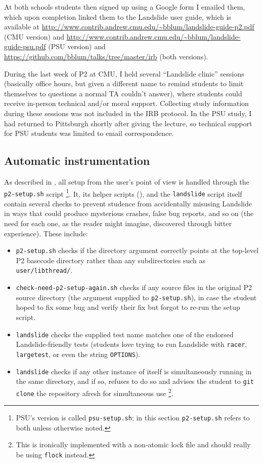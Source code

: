 At both schools students then signed up using a Google form I emailed them,
which upon completion linked them to the Landslide user guide,
which is available at
\url{http://www.contrib.andrew.cmu.edu/~bblum/landslide-guide-p2.pdf}
(CMU version)
and
\url{http://www.contrib.andrew.cmu.edu/~bblum/landslide-guide-psu.pdf}
(PSU version)
and
\url{https://github.com/bblum/talks/tree/master/irb}
(both versions).

During the last week of P2 at CMU, I held several ``Landslide clinic'' sessions
(basically office hours, but given a different name to remind students
to limit themselves to questions a normal TA couldn't answer),
where students could receive in-person technical and/or moral support.
Collecting study information during these sessions was not included in the IRB protocol.
In the PSU study, I had returned to Pittsburgh shortly after giving the lecture,
so technical support for PSU students was limited to email correspondence.

\subsection{Automatic instrumentation}
\label{sec:education-pebbles-instrumentation}

As described in \sect{\ref{sec:landslide-setup}},
all setup from the user's point of view is handled through the {\tt p2-setup.sh} script%
\footnote{PSU's version is called {\tt psu-setup.sh};
in this section {\tt p2-setup.sh} refers to both unless otherwise noted.
}.
It, its helper scripts (\sect{\ref{sec:landslide-glue}}),
and the {\tt landslide} script itself contain several checks to prevent
studence
from accidentally misusing Landslide in ways that could produce mysterious crashes, false bug reports, and so on
(the need for each one, as the reader might imagine, discovered through bitter experience).
These include:
\begin{itemize}
	\item {\tt p2-setup.sh} checks if the directory argument correctly points at the top-level P2 basecode directory
		rather than any subdirectories such as {\tt user/libthread/}.
	\item {\tt check-need-p2-setup-again.sh} checks if any source files in the original P2 source directory
		(the argument supplied to {\tt p2-setup.sh}),
		in case the student hoped to fix some bug and verify their fix but forgot to re-run the setup script.
	\item {\tt landslide} checks the supplied test name matches one of the endorsed Landslide-friendly tests
		(students love trying to run Landslide with {\tt racer}, {\tt largetest},
		or even the string {\tt OPTIONS}).
	\item {\tt landslide} checks if any other instance of itself is simultaneously running in the same directory,
		and if so, refuses to do so and advises the student
		to {\tt git clone} the repository afresh for simultaneous use%
		\footnote{This is ironically implemented with a non-atomic lock file
		and should really be using {\tt flock} instead.
		}.
\end{itemize}
\vspace{1em}

